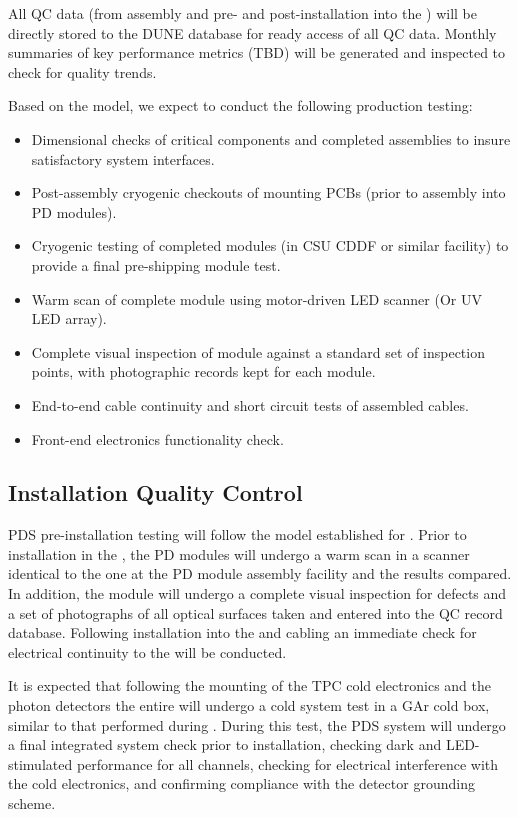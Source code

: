All QC data  (from assembly and pre- and post-installation into the ) will be directly stored to the DUNE database for ready access of all QC data.  Monthly summaries of key performance metrics (TBD) will be generated and inspected to check for quality trends.

Based on the  model, we expect to conduct the following production testing:
\begin{itemize}
\item Dimensional checks of critical components and completed assemblies to insure satisfactory system interfaces.
\item Post-assembly cryogenic checkouts of  mounting PCBs (prior to assembly into PD modules).
\item Cryogenic testing of completed modules (in CSU CDDF or similar facility) to provide a final pre-shipping module test.
\item Warm scan of complete module using motor-driven LED scanner (Or UV LED array).
\item Complete visual inspection of module against a standard set of inspection points, with photographic records kept for each module.
\item End-to-end cable continuity and short circuit tests of assembled cables.
\item Front-end electronics functionality check.
\end{itemize}

\subsection{Installation Quality Control}
\label{sec:fdsp-pd-prodqc}

PDS pre-installation testing will follow the model established for .  Prior to installation in the , the PD modules will undergo a warm scan in a scanner identical to the one at the PD module assembly facility and the results compared.  In addition, the module will undergo a complete visual inspection for defects and a set of photographs of all optical surfaces taken and entered into the QC record database.  Following installation into the  and cabling an immediate check for electrical continuity to the  will be conducted.

It is expected that following the mounting of the TPC cold electronics and the photon detectors the entire  will undergo a cold system test in a GAr cold box, similar to that performed during .  During this test, the PDS system will undergo a final integrated system check prior to installation, checking dark and LED-stimulated  performance for all channels, checking for electrical interference with the cold electronics, and confirming compliance with the detector grounding scheme.
